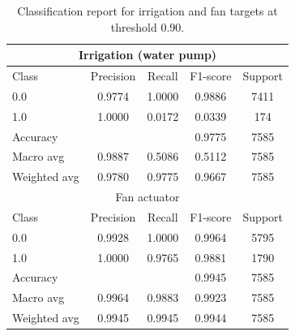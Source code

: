 \documentclass[sn-mathphys,Numbered]{sn-jnl}
\begin{document}
\begin{table}[ht]
    \centering
    \caption{Classification report for irrigation and fan targets at threshold 0.90.}
    \label{tab:thr-0.9}
    \begin{tabular}{lcccc}
        \toprule
        \multicolumn{5}{c}{Irrigation (water pump)} \\
        \midrule
        Class & Precision & Recall & F1-score & Support \\
        \midrule
        0.0 & 0.9774 & 1.0000 & 0.9886 & 7411 \\
        1.0 & 1.0000 & 0.0172 & 0.0339 & 174 \\
        \midrule
        Accuracy     &        &        & 0.9775 & 7585 \\
        Macro avg    & 0.9887 & 0.5086 & 0.5112 & 7585 \\
        Weighted avg & 0.9780 & 0.9775 & 0.9667 & 7585 \\
        \midrule
        \multicolumn{5}{c}{Fan actuator} \\
        \midrule
        Class & Precision & Recall & F1-score & Support \\
        \midrule
        0.0 & 0.9928 & 1.0000 & 0.9964 & 5795 \\
        1.0 & 1.0000 & 0.9765 & 0.9881 & 1790 \\
        \midrule
        Accuracy     &        &        & 0.9945 & 7585 \\
        Macro avg    & 0.9964 & 0.9883 & 0.9923 & 7585 \\
        Weighted avg & 0.9945 & 0.9945 & 0.9944 & 7585 \\
        \bottomrule
    \end{tabular}
\end{table}
\end{document}
